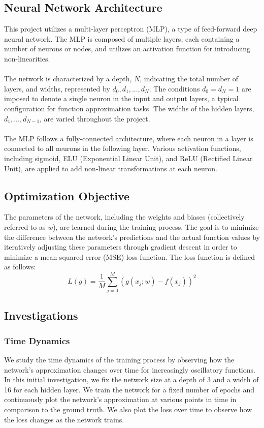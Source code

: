 \documentclass[11pt]{article}
\begin{document}
\subsection{Neural Network Architecture}
This project utilizes a multi-layer perceptron (MLP), a type of feed-forward deep neural network. The MLP is composed of multiple layers, each containing a number of neurons or nodes, and utilizes an activation function for introducing non-linearities.
\\\\
The network is characterized by a depth, $N$, indicating the total number of layers, and widths, represented by $d_0, d_1, ..., d_N$. The conditions $d_0 = d_N = 1$ are imposed to denote a single neuron in the input and output layers, a typical configuration for function approximation tasks. The widths of the hidden layers, $d_1, ..., d_{N-1}$, are varied throughout the project.
\\\\
The MLP follows a fully-connected architecture, where each neuron in a layer is connected to all neurons in the following layer. Various activation functions, including sigmoid, ELU (Exponential Linear Unit), and ReLU (Rectified Linear Unit), are applied to add non-linear transformations at each neuron.

\subsection{Optimization Objective}
The parameters of the network, including the weights and biases (collectively referred to as $w$), are learned during the training process. The goal is to minimize the difference between the network's predictions and the actual function values by iteratively adjusting these parameters through gradient descent in order to minimize a mean squared error (MSE) loss function. The loss function is defined as follows:
\begin{equation}
    L(g) = \frac{1}{M} \sum_{j=0}^{M} (g(x_j;w) - f(x_j))^2
\end{equation}

\subsection{Investigations}
\subsubsection{Time Dynamics}
We study the time dynamics of the training process by observing how the network's approximation changes over time for increasingly oscillatory functions. In this initial investigation, we fix the network size at a depth of 3 and a width of 16 for each hidden layer. We train the network for a fixed number of epochs and continuously plot the network's approximation at various points in time in comparison to the ground truth. We also plot the loss over time to observe how the loss changes as the network trains.
\end{document}
